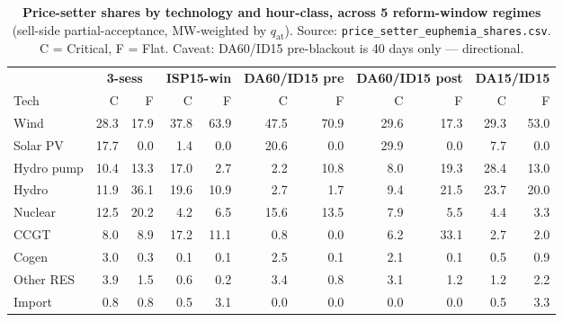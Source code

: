 \documentclass[11pt,a4paper]{article}
\newcommand{\code}[1]{\nolinkurl{#1}}
\begin{document}
\begin{table}[H]
\centering\scriptsize
\caption{\textbf{Price-setter shares by technology and hour-class, across 5 reform-window regimes} (sell-side partial-acceptance, MW-weighted by $q_{\text{at}}$). Source: \code{price_setter_euphemia_shares.csv}. C = Critical, F = Flat. Caveat: DA60/ID15 pre-blackout is 40 days only --- directional.}
\label{tab:pricesetter_tech_euphemia}
\setlength{\tabcolsep}{4pt}
\begin{tabular}{l r r r r r r r r r r}
\toprule
 & \multicolumn{2}{c}{\textbf{3-sess}} & \multicolumn{2}{c}{\textbf{ISP15-win}} & \multicolumn{2}{c}{\textbf{DA60/ID15 pre}} & \multicolumn{2}{c}{\textbf{DA60/ID15 post}} & \multicolumn{2}{c}{\textbf{DA15/ID15}} \\
\cmidrule(lr){2-3}\cmidrule(lr){4-5}\cmidrule(lr){6-7}\cmidrule(lr){8-9}\cmidrule(lr){10-11}
Tech & C & F & C & F & C & F & C & F & C & F \\
\midrule
Wind         & 28.3 & 17.9 & 37.8 & 63.9 & 47.5 & 70.9 & 29.6 & 17.3 & 29.3 & 53.0 \\
Solar PV     & 17.7 &  0.0 &  1.4 &  0.0 & 20.6 &  0.0 & 29.9 &  0.0 &  7.7 &  0.0 \\
Hydro pump   & 10.4 & 13.3 & 17.0 &  2.7 &  2.2 & 10.8 &  8.0 & 19.3 & 28.4 & 13.0 \\
Hydro        & 11.9 & 36.1 & 19.6 & 10.9 &  2.7 &  1.7 &  9.4 & 21.5 & 23.7 & 20.0 \\
Nuclear      & 12.5 & 20.2 &  4.2 &  6.5 & 15.6 & 13.5 &  7.9 &  5.5 &  4.4 &  3.3 \\
CCGT         &  8.0 &  8.9 & 17.2 & 11.1 &  0.8 &  0.0 &  6.2 & 33.1 &  2.7 &  2.0 \\
Cogen        &  3.0 &  0.3 &  0.1 &  0.1 &  2.5 &  0.1 &  2.1 &  0.1 &  0.5 &  0.9 \\
Other RES    &  3.9 &  1.5 &  0.6 &  0.2 &  3.4 &  0.8 &  3.1 &  1.2 &  1.2 &  2.2 \\
Import       &  0.8 &  0.8 &  0.5 &  3.1 &  0.0 &  0.0 &  0.0 &  0.0 &  0.5 &  3.3 \\
\bottomrule
\end{tabular}
\end{table}
\end{document}

